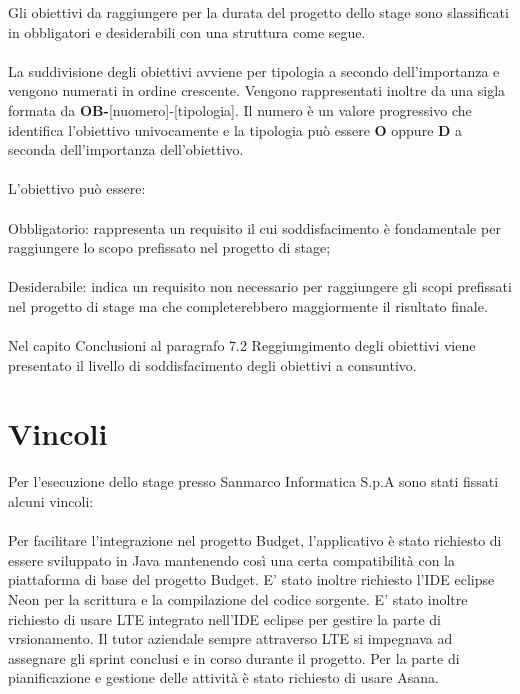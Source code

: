 Gli obiettivi da raggiungere per la durata del progetto dello stage sono slassificati in obbligatori e desiderabili con una struttura come segue.
\\ \\
 
La suddivisione degli obiettivi avviene per tipologia a secondo dell'importanza e vengono numerati in ordine crescente. Vengono rappresentati inoltre da una sigla formata da \textbf{OB-}[nuomero]-[tipologia]. Il numero è un valore progressivo che identifica l'obiettivo univocamente e la tipologia può essere \textbf{O} oppure \textbf{D} a seconda dell'importanza dell'obiettivo. \\\\

L'obiettivo può essere: \\\\

Obbligatorio: rappresenta un requisito il cui soddisfacimento è fondamentale
per raggiungere lo scopo prefissato nel progetto di stage;
\\\\
Desiderabile: indica un requisito non necessario per raggiungere gli scopi
prefissati nel progetto di stage ma che completerebbero maggiormente il risultato finale.
\\\\
Nel capito Conclusioni al paragrafo 7.2 Reggiungimento degli obiettivi viene presentato
il livello di soddisfacimento degli obiettivi a consuntivo.



\section{Vincoli}
Per l'esecuzione dello stage presso Sanmarco Informatica S.p.A sono stati fissati alcuni vincoli: \\\\

Per facilitare l'integrazione nel progetto Budget, l'applicativo è stato richiesto di essere sviluppato in Java mantenendo così una certa compatibilità con la piattaforma di base del progetto Budget. 
E' stato inoltre richiesto l'IDE eclipse Neon per la scrittura e la compilazione del codice sorgente. E' stato inoltre richiesto di usare LTE integrato nell'IDE eclipse per gestire la parte di vrsionamento. Il tutor aziendale sempre attraverso LTE si impegnava ad assegnare gli sprint conclusi e in corso durante il progetto. Per la parte di pianificazione e gestione delle attività è stato richiesto di usare Asana.  \\

